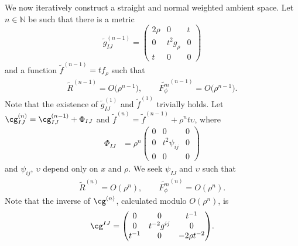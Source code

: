 We now iteratively construct a straight and normal weighted ambient space.
Let $n\in\mathbb{N}$ be such that there is a metric
\[
\widetilde{g}_{IJ}^{(n-1)} = \begin{pmatrix}
2\rho & 0 & t \\
0 & t^2 g_{\rho} & 0 \\
t & 0 & 0
\end{pmatrix}
\]
and a function $\widetilde{f}^{(n-1)}=tf_\rho$ such that
\begin{gather*}
\widetilde{R}^{(n-1)}=O\big(\rho^{n-1}\big),
\qquad
\widetilde{F_{\phi}^m}^{(n-1)}=O\big(\rho^{n-1}\big).
\end{gather*}
Note that the existence of $\widetilde{g}_{IJ}^{(1)}$ and $\widetilde{f}^{(1)}$ trivially holds. Let $\cg^{(n)}_{IJ}=\cg^{(n-1)}_{IJ}+\Phi_{IJ}$ and $\widetilde{f}^{(n)}= \widetilde{f}^{(n-1)}+\rho^{n}t\upsilon$, where
\begin{align*}
\Phi_{IJ}&= \rho^n \begin{pmatrix}
0 & 0 & 0 \\
0 & t^2\psi_{ij} & 0 \\
0 & 0 & 0
\end{pmatrix}
\end{align*}
and $\psi_{ij}$, $\upsilon$ depend only on $x$ and $\rho$.
We seek $\psi_{IJ}$ and $\upsilon$ such that
 \begin{gather*}
\widetilde{R}^{(n)}= O(\rho^{n}),
\qquad
\widetilde{F_{\phi}^m}^{(n)} = O(\rho^{n}).
\end{gather*}
Note that the inverse of $\cg^{(n)}$, calculated modulo $O(\rho^n)$, is
\[
\cg^{IJ} = \begin{pmatrix} 0 & 0 & t^{-1}\\ 0 & t^{-2}g^{ij}& 0\\ t^{-1} & 0 & -{2\rho}t^{-2}\end{pmatrix}\!.
\]

